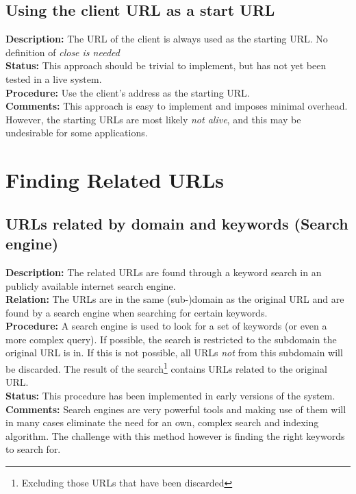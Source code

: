 \documentclass[a4paper]{danarticle}
\begin{document}
      \subsection*{Using the client URL as a start URL}
      \textbf{Description:} The URL of the client is always used as the starting
      URL. No definition of \textit{close is needed}
      \\
      \textbf{Status:} This approach should be trivial to implement, but
      has not yet been tested in a live system.
      \\
      \textbf{Procedure:} Use the client's address as the starting URL.
      \\
      \textbf{Comments:} This approach is easy to implement and imposes minimal
      overhead. However, the starting URLs are most likely \textit{not alive},
      and this may be undesirable for some applications.
    \section*{Finding Related URLs}
      \subsection*{URLs related by domain and keywords (Search engine)}
      \textbf{Description:} The related URLs are found through a keyword search
      in an publicly available internet search engine.
      \\
      \textbf{Relation:} The URLs are in the same (sub-)domain as the
      original URL and are found by a search engine when searching for 
      certain keywords.
      \\
      \textbf{Procedure:} A search engine is used to look for a set
      of keywords (or even a more complex query). If possible, the search
      is restricted to the subdomain the original URL is in. If this is not
      possible, all URLs \textit{not} from this subdomain will be discarded.
      The result of the search\footnote{Excluding those URLs that have been 
      discarded} contains URLs related to the original URL.
      \\
      \textbf{Status:} This procedure has been implemented in early
      versions of the system.
      \\
      \textbf{Comments:} Search engines are very powerful tools and making use
      of them will in many cases eliminate the need for an own, complex
      search and indexing algorithm. The challenge with this method however
      is finding the right keywords to search for. 
      
\end{document}
